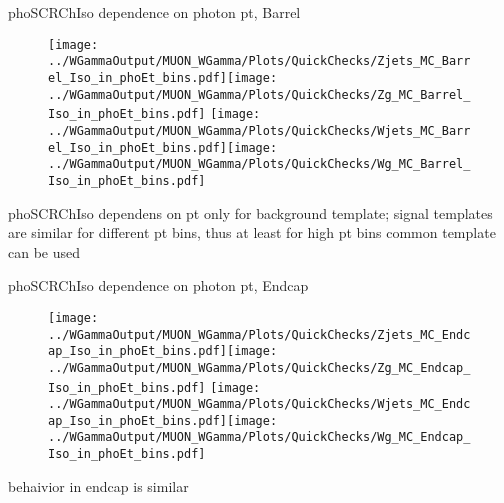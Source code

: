 \documentclass{beamer}
\begin{document}
\begin{frame}{phoSCRChIso dependence on photon pt, Barrel}
  \begin{figure}
    \centering
    \texttt{[image: ../WGammaOutput/MUON\_WGamma/Plots/QuickChecks/Zjets\_MC\_Barrel\_Iso\_in\_phoEt\_bins.pdf]}\texttt{[image: ../WGammaOutput/MUON\_WGamma/Plots/QuickChecks/Zg\_MC\_Barrel\_Iso\_in\_phoEt\_bins.pdf]}
    \texttt{[image: ../WGammaOutput/MUON\_WGamma/Plots/QuickChecks/Wjets\_MC\_Barrel\_Iso\_in\_phoEt\_bins.pdf]}\texttt{[image: ../WGammaOutput/MUON\_WGamma/Plots/QuickChecks/Wg\_MC\_Barrel\_Iso\_in\_phoEt\_bins.pdf]}
  \end{figure}
  \scriptsize phoSCRChIso dependens on pt only for background template; signal templates are similar for different pt bins, thus at least for high pt bins common template can be used
\end{frame}

\begin{frame}{phoSCRChIso dependence on photon pt, Endcap}
  \begin{figure}
    \centering
    \texttt{[image: ../WGammaOutput/MUON\_WGamma/Plots/QuickChecks/Zjets\_MC\_Endcap\_Iso\_in\_phoEt\_bins.pdf]}\texttt{[image: ../WGammaOutput/MUON\_WGamma/Plots/QuickChecks/Zg\_MC\_Endcap\_Iso\_in\_phoEt\_bins.pdf]}
    \texttt{[image: ../WGammaOutput/MUON\_WGamma/Plots/QuickChecks/Wjets\_MC\_Endcap\_Iso\_in\_phoEt\_bins.pdf]}\texttt{[image: ../WGammaOutput/MUON\_WGamma/Plots/QuickChecks/Wg\_MC\_Endcap\_Iso\_in\_phoEt\_bins.pdf]}
  \end{figure}
  \scriptsize behaivior in endcap is similar
\end{frame}
\end{document}
